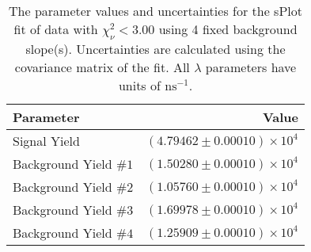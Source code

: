 
\begin{table}
    \begin{center}
        \begin{tabular}{lr}\toprule
            Parameter & Value \\\midrule
            Signal Yield & $(4.79462 \pm 0.00010) \times 10^{4}$ \\
            Background Yield $\#1$ & $(1.50280 \pm 0.00010) \times 10^{4}$ \\
            Background Yield $\#2$ & $(1.05760 \pm 0.00010) \times 10^{4}$ \\
            Background Yield $\#3$ & $(1.69978 \pm 0.00010) \times 10^{4}$ \\
            Background Yield $\#4$ & $(1.25909 \pm 0.00010) \times 10^{4}$ \\\bottomrule
        \end{tabular}
        \caption{The parameter values and uncertainties for the sPlot fit of data with $\chi^2_\nu < 3.00$ using 4 fixed background slope(s). Uncertainties are calculated using the covariance matrix of the fit. All $\lambda$ parameters have units of $\si{\nano\second}^{-1}$.}
    \end{center}
\end{table}

